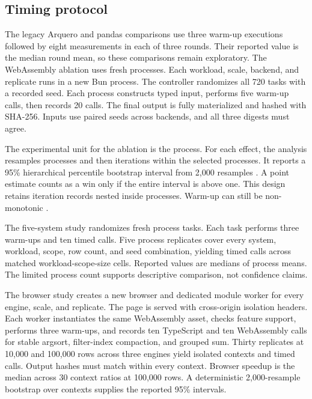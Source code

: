 \documentclass[pdflatex,sn-basic,Numbered]{sn-jnl}
\begin{document}
\subsection{Timing protocol}

The legacy Arquero and pandas comparisons use three warm-up executions followed by eight measurements in each of three rounds. Their reported value is the median round mean, so these comparisons remain exploratory. The WebAssembly ablation uses fresh processes. Each workload, scale, backend, and replicate runs in a new Bun process. The controller randomizes all 720 tasks with a recorded seed. Each process constructs typed input, performs five warm-up calls, then records 20 calls. The final output is fully materialized and hashed with SHA-256. Inputs use paired seeds across backends, and all three digests must agree.

The experimental unit for the ablation is the process. For each effect, the analysis resamples processes and then iterations within the selected processes. It reports a 95\% hierarchical percentile bootstrap interval from 2,000 resamples \cite{georges2007statistically,kalibera2013rigorous}. A point estimate counts as a win only if the entire interval is above one. This design retains \FreshIterations{} iteration records nested inside \FreshProcesses{} processes. Warm-up can still be non-monotonic \cite{barrett2017warmup}.

The five-system study randomizes \CompetitorProcesses{} fresh process tasks. Each task performs three warm-ups and ten timed calls. Five process replicates cover every system, workload, scope, row count, and seed combination, yielding \CompetitorIterations{} timed calls across \CompetitorCells{} matched workload-scope-size cells. Reported values are medians of process means. The limited process count supports descriptive comparison, not confidence claims.

The browser study creates a new browser and dedicated module worker for every engine, scale, and replicate. The page is served with cross-origin isolation headers. Each worker instantiates the same WebAssembly asset, checks feature support, performs three warm-ups, and records ten TypeScript and ten WebAssembly calls for stable argsort, filter-index compaction, and grouped sum. Thirty replicates at 10,000 and 100,000 rows across three engines yield \BrowserContexts{} isolated contexts and \BrowserTimedCalls{} timed calls. Output hashes must match within every context. Browser speedup is the median across 30 context ratios at 100,000 rows. A deterministic 2,000-resample bootstrap over contexts supplies the reported 95\% intervals.
\end{document}
